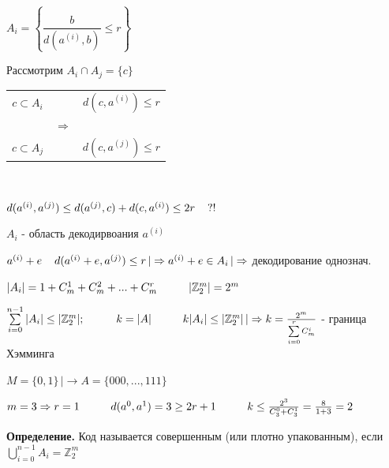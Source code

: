 \documentclass[12pt]{article}
\begin{document}
$A_i = \left\{ \dfrac{b}{d(a^{(i)}, b)} \leq r \right\}$\par
Рассмотрим $A_i \cap A_j = \{ c \}$\par
\begin{tabular}{c|cc}
    $c \subset A_i$ &               & $d(c,a^{(i)}) \leq r$ \\
                    & $\Rightarrow$                         \\
    $c \subset A_j$ &               & $d(c,a^{(j)}) \leq r$ \\
\end{tabular}\par
$ $\par
$d(a^{(i)},a^{(j)}) \leq d(a^{(j)},c) + d(c,a^{(i)}) \leq 2r \hspace{4 mm} ?!$\par
$A_i$ - область декодирвоания $a^{(i)}$\par
$a^{(i)}+e \hspace{4 mm} d(a^{(i)}+e, a^{(j)}) \leq r \, | \Rightarrow a^{(i)}+e \in A_i \, | \Rightarrow$ декодирование однознач.\par
$|A_i| = 1 + C_m^1 + C_m^2 + ... + C_m^r \hspace{1 cm} |\mathbb{Z}_2^m| = 2^m$\par
$\sum\limits_{i=0}^{n-1}|A_i| \leq |\mathbb{Z}_2^m|; \hspace{1 cm} k = |A| \hspace{1 cm} k|A_i| \leq |\mathbb{Z}_2^m| \, |\Rightarrow k = \frac{2^m}{\sum\limits_{i=0}^{r} C_m^i}$ - граница Хэмминга\par
$M = \{ 0, 1 \} \, |\to A = \{ 000,...,111 \}$\par
$m = 3 \Rightarrow r = 1 \hspace{1 cm} d(a^0, a^1)=3 \geq 2r+1 \hspace{1 cm} k \leq \frac{2^3}{C_3^0 + C_3^1} = \frac{8}{1+3} = 2$\par
\textbf{Определение.} Код называется совершенным (или плотно упакованным), если $\bigcup\limits_{i=0}^{n-1}A_i = \mathbb{Z}_2^m$\par
\end{document}
